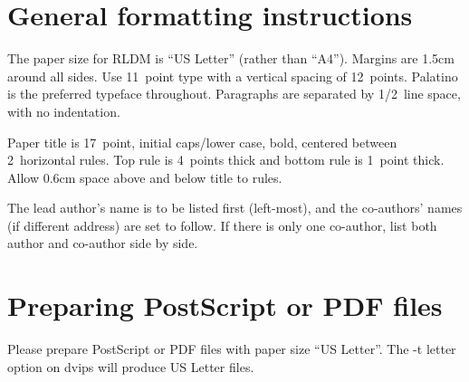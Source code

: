 \documentclass[11pt]{article} %
\begin{document}
\section{General formatting instructions}
\label{gen_inst}

The paper size for RLDM is ``US Letter'' (rather than ``A4''). Margins
are 1.5cm around all sides. Use 11~point type with a vertical spacing
of 12~points. Palatino is the preferred typeface throughout.
Paragraphs are separated by 1/2~line space, with no indentation.

Paper title is 17~point, initial caps/lower case, bold, centered between
2~horizontal rules. Top rule is 4~points thick and bottom rule is 1~point
thick. Allow 0.6cm space above and below title to rules. 

The lead author's name is to be listed first (left-most), and
the co-authors' names (if different address) are set to follow. If
there is only one co-author, list both author and co-author side by side.

\section{Preparing PostScript or PDF files}

Please prepare PostScript or PDF files with paper size ``US Letter''.
The -t letter option on dvips will produce US Letter files.
\end{document}
